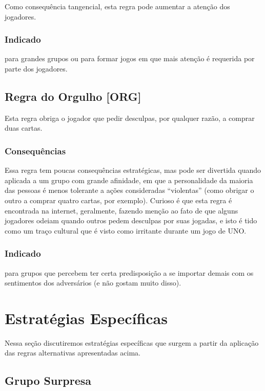 Como consequência tangencial, esta regra pode aumentar a atenção dos jogadores.

\subsubsection{Indicado} 

para grandes grupos ou para formar jogos em que mais atenção é requerida por parte dos jogadores.

\subsection{Regra do Orgulho [ORG]}

Esta regra obriga o jogador que pedir desculpas, por qualquer razão, a comprar duas cartas.

\subsubsection{Consequências}

Essa regra tem poucas consequências estratégicas, mas pode ser divertida quando aplicada a um grupo com grande afinidade, em que a personalidade da maioria das pessoas é menos tolerante a ações consideradas ``violentas'' (como obrigar o outro a comprar quatro cartas, por exemplo). Curioso é que esta regra é encontrada na internet, geralmente, fazendo menção ao fato de que alguns jogadores odeiam quando outros pedem desculpas por suas jogadas, e isto é tido como um traço cultural que é visto como irritante durante um jogo de UNO.

\subsubsection{Indicado}

para grupos que percebem ter certa predisposição a se importar demais com os sentimentos dos adversários (e não gostam muito disso).

\section{Estratégias Específicas}

Nessa seção discutiremos estratégias específicas que surgem a partir da aplicação das regras alternativas apresentadas acima.

\subsection{Grupo Surpresa}

